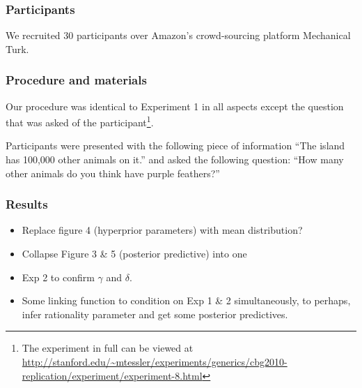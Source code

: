 \documentclass[10pt,letterpaper]{article}
\begin{document}
\subsubsection{Participants}

We recruited 30 participants over Amazon's crowd-sourcing platform Mechanical Turk. 

\subsubsection{Procedure and materials}

Our procedure was identical to Experiment 1 in all aspects except the question that was asked of the participant\footnote{The experiment in full can be viewed at \url{http://stanford.edu/~mtessler/experiments/generics/cbg2010-replication/experiment/experiment-8.html}}. 

Participants were presented with the following piece of information ``The island has 100,000 other animals on it.'' and asked the following question: ``How many other animals do you think have purple feathers?''

\subsubsection{Results}



\begin{itemize}

\item Replace figure 4 (hyperprior parameters) with mean distribution?

\item Collapse Figure 3 \& 5 (posterior predictive) into one

\item Exp 2 to confirm $\gamma$ and $\delta$. 

\item Some linking function to condition on Exp 1 \& 2 simultaneously,  to perhaps, infer rationality parameter and get some posterior predictives.

\end{itemize}
\end{document}
